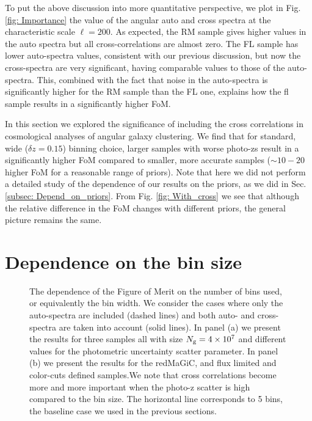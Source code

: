 \documentclass[a4paper,fleqn,usenatbib]{mnras}
\begin{document}
To put the above discussion into  more quantitative perspective, we plot in Fig. \ref{fig: Importance} the value of the angular auto and cross spectra at the characteristic scale $\ell = 200$. As expected, the RM sample gives higher values in the auto spectra but all cross-correlations are almost zero. The FL sample has lower auto-spectra values, consistent with our previous discussion,  but now the cross-spectra are very significant, having comparable values to those of the auto-spectra. This, combined  with the fact that noise in the auto-spectra is significantly higher for the RM sample than the FL one, explains how the fl sample results in a significantly higher FoM.

In this section we explored the significance of including the cross correlations in cosmological analyses of angular galaxy clustering. We find that for standard, wide ($\delta z = 0.15$) binning choice, larger samples with worse photo-zs result in a significantly higher FoM compared to smaller, more accurate samples ($\sim 10-20$  higher FoM for a reasonable range of priors). Note that here we did not perform a detailed study of the dependence of our results on the priors, as we did in Sec. \ref{subsec: Depend_on_priors}. From Fig. \ref{fig: With_cross} we see that although the relative difference in the FoM changes with different priors, the general picture remains the same. 


\section{Dependence on the bin size}



\begin{figure*}
\centering
{}
\caption{The dependence of the Figure of Merit on the number of bins used, or equivalently the bin width. We consider  the cases where only the auto-spectra are included (dashed lines) and both auto- and cross-spectra are taken into account (solid lines). In panel (a) we present the results for three samples all with size $N_{\mbox{\scriptsize{g}}} = 4 \times 10^7$ and different values for the photometric uncertainty scatter parameter. In panel (b) we present the results for the redMaGiC, and flux limited  and color-cuts defined samples.We note  that cross correlations become more and more important when the photo-z scatter is high compared to the bin size. The horizontal line corresponds to 5 bins, the baseline case we used in the previous sections.  }
\label{fig: Number_of_bins}
\end{figure*}
\end{document}
